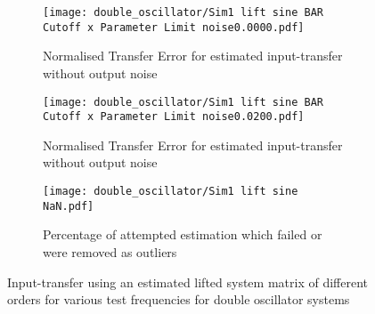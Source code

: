 %
%
%
%
%


\begin{figure}
    \centering
    \begin{subfigure}[t]{1\textwidth}
        \centering
        \texttt{[image: double\_oscillator/Sim1 lift sine BAR Cutoff x Parameter Limit noise0.0000.pdf]}
        \caption{Normalised Transfer Error for estimated input-transfer without output noise}
        \label{subfig:sim1_sine_det_lsd}
    \end{subfigure}
    \hfill
    \begin{subfigure}[t]{1\textwidth}
        \centering
        \texttt{[image: double\_oscillator/Sim1 lift sine BAR Cutoff x Parameter Limit noise0.0200.pdf]}
        \caption{Normalised Transfer Error for estimated input-transfer without output noise}
        \label{subfig:sim1_sine_noise_lsd}
    \end{subfigure}
    \hfill
    \begin{subfigure}[t]{1\textwidth}
        \centering
        \texttt{[image: double\_oscillator/Sim1 lift sine NaN.pdf]}
        \caption{Percentage of attempted estimation which failed or were removed as outliers}
        \label{subfig:sim1_sine_failes_lsd}
    \end{subfigure}
    \caption[Double Oscillator -- Results for Sinusoidal Test Inputs (Transfer Matrix)]{Input-transfer using an estimated lifted system matrix of different orders for various test frequencies for double oscillator systems}
    \label{fig:sim1_sine_results_lsd}
\end{figure}


